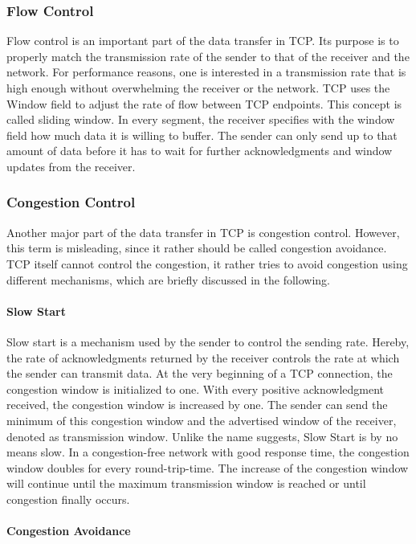 \subsubsection{Flow Control}

Flow control is an important part of the data transfer in TCP. Its purpose is to properly match the transmission rate of the sender to that of the receiver and the network. For performance reasons, one is interested in a transmission rate that is high enough without overwhelming the receiver or the network. TCP uses the Window field to adjust the rate of flow between TCP endpoints. This concept is called sliding window. In every segment, the receiver specifies with the window field how much data it is willing to buffer. The sender can only send up to that amount of data before it has to wait for further acknowledgments and window updates from the receiver. 

\subsubsection{Congestion Control}

Another major part of the data transfer in TCP is congestion control. However, this term is misleading, since it rather should be called congestion avoidance. TCP itself cannot control the congestion, it rather tries to avoid congestion using different mechanisms, which are briefly discussed in the following. 

\paragraph{Slow Start}

Slow start is a mechanism used by the sender to control the sending rate. Hereby, the rate of acknowledgments returned by the receiver controls the rate at which the sender can transmit data. At the very beginning of a TCP connection, the congestion window is initialized to one. With every positive acknowledgment received, the congestion window is increased by one. The sender can send the minimum of this congestion window and the advertised window of the receiver, denoted as transmission window. Unlike the name suggests, Slow Start is by no means slow. In a congestion-free network with good response time, the congestion window doubles for every round-trip-time. The increase of the congestion window will continue until the maximum transmission window is reached or until congestion finally occurs.

\paragraph{Congestion Avoidance}

